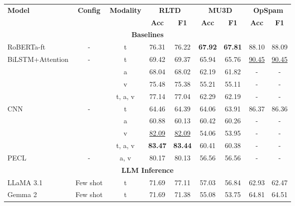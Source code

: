 \begin{table}[h!]
\centering
\footnotesize
\begin{tabular}{l c c cc cc cc}  %
\toprule
\multirow{2}{*}{\textbf{Model}} 
  & \multirow{2}{*}{\textbf{Config}} 
  & \multirow{2}{*}{\textbf{Modality}} 
  & \multicolumn{2}{c}{\textbf{RLTD}} 
  & \multicolumn{2}{c}{\textbf{MU3D}} 
  & \multicolumn{2}{c}{\textbf{OpSpam}} \\
  \cmidrule(lr){4-5}\cmidrule(lr){6-7}\cmidrule(lr){8-9}
& & & \textbf{Acc} & \textbf{F1} & \textbf{Acc} & \textbf{F1} & \textbf{Acc} & \textbf{F1} \\
\midrule
\multicolumn{9}{c}{\textbf{Baselines}} \\  %
\midrule
RoBERTa-ft 
  & - & t        & 76.31 & 76.22 & \textbf{67.92} & \textbf{67.81} & 88.10 & 88.09 \\
\midrule
\multirow{4}{*}{BiLSTM+Attention}
  & \multirow{4}{*}{-} & t        & 69.42 & 69.37 & 65.94 & 65.76 & \underline{90.45} & \underline{90.45} \\
  &                    & a        & 68.04 & 68.02 & 62.19 & 61.82 & -     & -     \\
  &                    & v        & 75.48 & 75.38 & 55.21 & 55.11 & -     & -     \\
  &                    & t, a, v  & 77.14 & 77.04 & 62.29 & 62.19 & -     & -     \\
\midrule
\multirow{4}{*}{CNN}
  & \multirow{4}{*}{-} & t        & 64.46 & 64.39 & 64.06 & 63.91 & 86.37 & 86.36 \\
  &                    & a        & 60.88 & 60.13 & 60.42 & 60.26 & -     & -     \\
  &                    & v        & \underline{82.09} & \underline{82.09} & 54.06 & 53.95 & -     & -     \\
  &                    & t, a, v  & \textbf{83.47} & \textbf{83.44} & 60.41 & 60.38 & -     & -     \\
\midrule
PECL 
  & - & a, v      & 80.17 & 80.13 & 56.56 & 56.56 & -     & -     \\
\midrule
\multicolumn{9}{c}{\textbf{LLM Inference}} \\
\midrule
LLaMA 3.1 & Few shot & t & 71.69 & 77.11 & 57.03 & 56.84 & 62.93 & 62.47 \\
\midrule
Gemma 2   & Few shot & t & 71.69 & 71.38 & 55.08 & 53.75 & 64.81 & 64.51 \\

\end{tabular}
\end{table}
